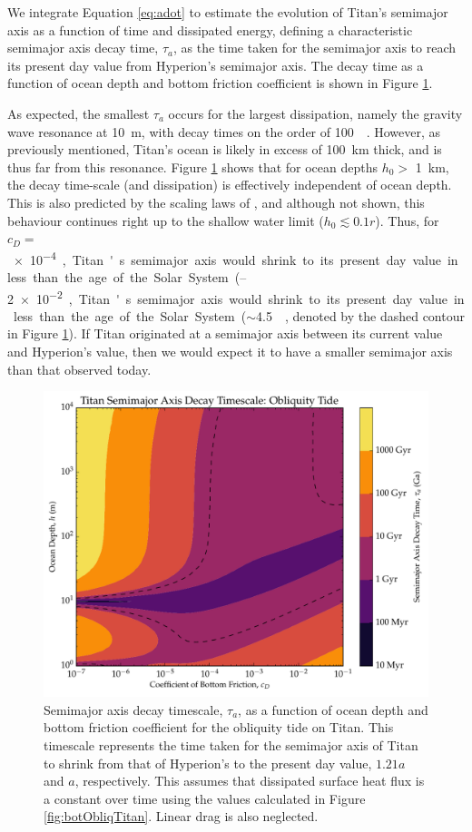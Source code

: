 We integrate Equation \ref{eq:adot} to estimate the evolution of Titan's semimajor axis as a function of time and dissipated energy, defining a characteristic semimajor axis decay time, $\tau_{a}$, as the time taken for the semimajor axis to reach its present day value from Hyperion's semimajor axis. The decay time as a function of ocean depth and bottom friction coefficient is shown in Figure \ref{fig:a_evo}.
  
As expected, the smallest $\tau_a$ occurs for the largest dissipation, namely the gravity wave resonance at \SI{10}{\metre}, with decay times on the order of \SI{100}{\mega\year}. However, as previously mentioned, Titan's ocean is likely in excess of \SI{100}{\kilo\metre} thick, and is thus far from this resonance. Figure \ref{fig:a_evo} shows that for ocean depths $h_0 >$ \SI{1}{\kilo\metre}, the decay time-scale (and dissipation) is effectively independent of ocean depth. This is also predicted by the scaling laws of \citet{chen2013tidal}, and although not shown, this behaviour continues right up to the shallow water limit ($h_0 \lesssim 0.1r$). Thus, for $c_D =$ \SIrange{e-4}{2e-2}, Titan's semimajor axis would shrink to its present day value in less than the age of the Solar System ($\sim$\SI{4.5}{\giga\year}, denoted by the dashed contour in Figure \ref{fig:a_evo}). If Titan originated at a semimajor axis between its current value and Hyperion's value, then we would expect it to have a smaller semimajor axis than that observed today.

\begin{figure}[!t]
\centering
\includegraphics[width=0.5\linewidth]{Figures/a_decay}
\caption{Semimajor axis decay timescale, $\tau_a$, as a function of ocean depth and bottom friction coefficient for the obliquity tide on Titan. This timescale represents the time taken for the semimajor axis of Titan to shrink from that of Hyperion's to the present day value, $1.21a$ and $a$, respectively. This assumes that dissipated surface heat flux is a constant over time using the values calculated in Figure \ref{fig:botObliqTitan}. Linear drag is also neglected.   \label{fig:a_evo}}
\end{figure}

